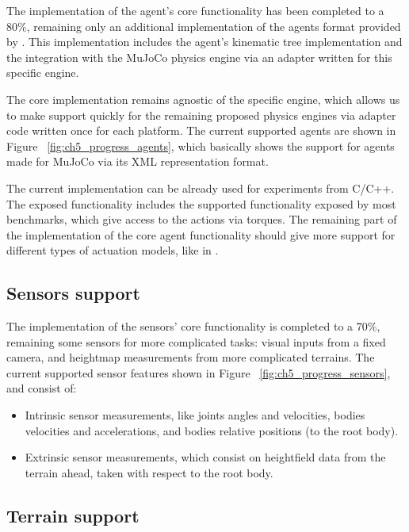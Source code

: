 The implementation of the agent's core functionality has been completed to a 80\%,
remaining only an additional implementation of the agents format provided by \cite{TerrainRLSim}.
This implementation includes the agent's kinematic tree implementation and the integration 
with the MuJoCo physics engine via an adapter written for this specific engine.

The core implementation remains agnostic of the specific engine, which allows us
to make support quickly for the remaining proposed physics engines via adapter code
written once for each platform. The current supported agents are shown in Figure ~\ref{fig:ch5_progress_agents},
which basically shows the support for agents made for MuJoCo via its XML representation format.

The current implementation can be already used for experiments from C/C++. The exposed
functionality includes the supported functionality exposed by most benchmarks, which
give access to the actions via torques. The remaining part of the implementation of the core
agent functionality should give more support for different types of actuation models, like in \cite{ActuationChoice}.

\figProgressAgents

\subsection*{Sensors support}

The implementation of the sensors' core functionality is completed to a 70\%,
remaining some sensors for more complicated tasks: visual inputs from a fixed camera,
and heightmap measurements from more complicated terrains. The current supported sensor
features shown in Figure ~\ref{fig:ch5_progress_sensors}, and consist of:

\begin{itemize}
    \item Intrinsic sensor measurements, like joints angles and velocities, bodies velocities
          and accelerations, and bodies relative positions (to the root body).
    \item Extrinsic sensor measurements, which consist on heightfield data from the terrain ahead,
          taken with respect to the root body.
\end{itemize}

\figProgressSensors

\subsection*{Terrain support}

